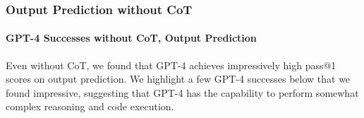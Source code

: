 

\subsubsection{Output Prediction without CoT}

\paragraph{GPT-4 Successes without CoT, Output Prediction}
Even without CoT, we found that GPT-4 achieves impressively high pass@1 scores on output prediction. We highlight a few GPT-4 successes below that we found impressive, suggesting that GPT-4 has the capability to perform somewhat complex reasoning and code execution. 

